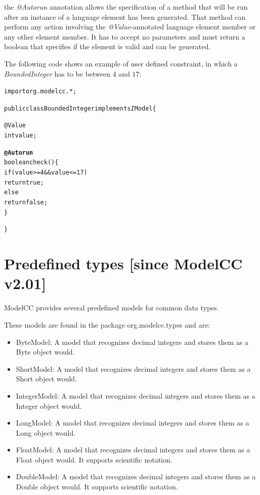 \documentclass[a4paper,twoside,onecolumn]{article}
\newenvironment{colframe}{%
  \begin{Sbox} 
    \begin{minipage}{.8\columnwidth} 
}{%

  \end{minipage} 
  \end{Sbox} 
  \begin{center} 
    \fcolorbox{black}{MyGray}{\TheSbox} 
  \end{center} 
}
\newcommand{\an}[1]{\emph{#1}} %
\begin{document}
the \an{@Autorun} annotation allows the specification of a method that will be run after an instance of a language element has been generated. That method can perform any action involving the \an{@Value}-annotated language element member or any other element member. It has to accept no parameters and must return a boolean that specifies if the element is valid and can be generated.

The following code shows an example of user defined constraint, in which a \emph{BoundedInteger} has to be between $4$ and $17$:

\begin{colframe}
\begin{alltt}
import org.modelcc.*;

public class BoundedInteger implements{\emph IModel} \{

  @Value
  int value;

  {\bf @Autorun}
  boolean check() \{
    if (value >= 4 && value <= 17)
      return true;
    else
      return false;
  \}

\}
\end{alltt}
\end{colframe}


\section{Predefined types [since ModelCC v2.01]} \label{sec:predefinedtypes}

ModelCC provides several predefined models for common data types.

These models are found in the package org.modelcc.types and are:

\begin{itemize}
\item ByteModel: A model that recognizes decimal integers and stores them as a Byte object would.
\item ShortModel: A model that recognizes decimal integers and stores them as a Short object would.
\item IntegerModel: A model that recognizes decimal integers and stores them as a Integer object would.
\item LongModel: A model that recognizes decimal integers and stores them as a Long object would.
\item FloatModel: A model that recognizes decimal integers and stores them as a Float object would. It supports scientific notation.
\item DoubleModel: A model that recognizes decimal integers and stores them as a Double object would. It supports scientific notation.
\end{itemize}
\end{document}
